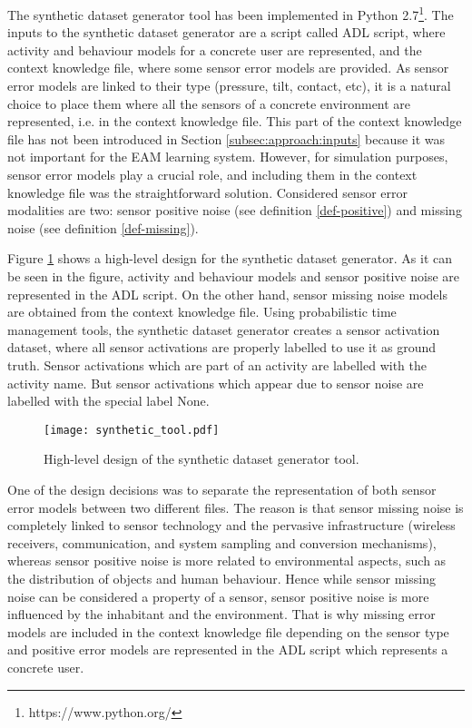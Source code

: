 The synthetic dataset generator tool has been implemented in Python 2.7\footnote{https://www.python.org/}. The inputs to the synthetic dataset generator are a script called ADL script, where activity and behaviour models for a concrete user are represented, and the context knowledge file, where some sensor error models are provided. As sensor error models are linked to their type (pressure, tilt, contact, etc), it is a natural choice to place them where all the sensors of a concrete environment are represented, i.e. in the context knowledge file. This part of the context knowledge file has not been introduced in Section \ref{subsec:approach:inputs} because it was not important for the EAM learning system. However, for simulation purposes, sensor error models play a crucial role, and including them in the context knowledge file was the straightforward solution. Considered sensor error modalities are two: sensor positive noise (see definition \ref{def-positive}) and missing noise (see definition \ref{def-missing}).

Figure \ref{fig-synth-tool} shows a high-level design for the synthetic dataset generator. As it can be seen in the figure, activity and behaviour models and sensor positive noise are represented in the ADL script. On the other hand, sensor missing noise models are obtained from the context knowledge file. Using probabilistic time management tools, the synthetic dataset generator creates a sensor activation dataset, where all sensor activations are properly labelled to use it as ground truth. Sensor activations which are part of an activity are labelled with the activity name. But sensor activations which appear due to sensor noise are labelled with the special label None. 

\begin{figure}[htbp]
\centering
\texttt{[image: synthetic\_tool.pdf]}
    \caption{High-level design of the synthetic dataset generator tool.}
    \label{fig-synth-tool}
\end{figure}

One of the design decisions was to separate the representation of both sensor error models between two different files. The reason is that sensor missing noise is completely linked to sensor technology and the pervasive infrastructure (wireless receivers, communication, and system sampling and conversion mechanisms), whereas sensor positive noise is more related to environmental aspects, such as the distribution of objects and human behaviour. Hence while sensor missing noise can be considered a property of a sensor, sensor positive noise is more influenced by the inhabitant and the environment. That is why missing error models are included in the context knowledge file depending on the sensor type and positive error models are represented in the ADL script which represents a concrete user.

